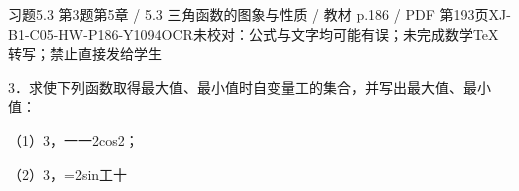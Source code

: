 \begin{bankitem}{习题5.3 第3题}{第5章 / 5.3 三角函数的图象与性质 / 教材 p.186 / PDF 第193页}{XJ-B1-C05-HW-P186-Y1094}{OCR未校对：公式与文字均可能有误；未完成数学TeX转写；禁止直接发给学生}
\begin{ocrdraft}
\par
3．求使下列函数取得最大值、最小值时自变量工的集合，并写出最大值、最小值：
\par
（1）3，一一2cos2；
\par
（2）3，=2sin工十
\end{ocrdraft}
\end{bankitem}
